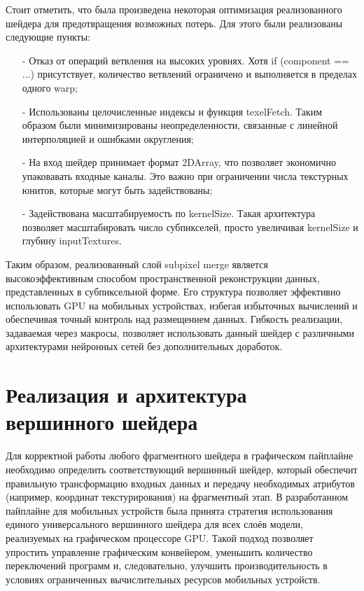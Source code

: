 \documentclass[a4paper,14pt]{extreport}
\begin{document}
            Стоит отметить, что была произведена некоторая оптимизация реализованного шейдера для предотвращения возможных потерь. Для этого были реализованы следующие пункты:
            \begin{itemize}
                \item[-] Отказ от операций ветвления на высоких уровнях. Хотя if (component == ...) присутствует, количество ветвлений ограничено и выполняется в пределах одного warp;
                \item[-] Использованы целочисленные индексы и функция texelFetch. Таким образом были минимизированы неопределенности, связанные с линейной интерполяцией и ошибками округления;
                \item[-] На вход шейдер принимает формат 2DArray, что позволяет экономично упаковавать входные каналы. Это важно при ограничении числа текстурных юнитов, которые могут быть задействованы;
                \item[-] Задействована масштабируемость по kernelSize. Такая архитектура позволяет масштабировать число субпикселей, просто увеличивая kernelSize и глубину inputTextures.
            \end{itemize}
            
            Таким образом, реализованный слой subpixel merge является высокоэффективным способом пространственной реконструкции данных, представленных в субпиксельной форме. Его структура позволяет эффективно использовать GPU на мобильных устройствах, избегая избыточных вычислений и обеспечивая точный контроль над размещением данных. Гибкость реализации, задаваемая через макросы, позволяет использовать данный шейдер с различными архитектурами нейронных сетей без дополнительных доработок.
        
        \section{Реализация и архитектура вершинного шейдера}
            Для корректной работы любого фрагментного шейдера в графическом пайплайне необходимо определить соответствующий вершинный шейдер, который обеспечит правильную трансформацию входных данных и передачу необходимых атрибутов (например, координат текстурирования) на фрагментный этап. В разработанном пайплайне для мобильных устройств была принята стратегия использования единого универсального вершинного шейдера для всех слоёв модели, реализуемых на графическом процессоре GPU. Такой подход позволяет упростить управление графическим конвейером, уменьшить количество переключений программ и, следовательно, улучшить производительность в условиях ограниченных вычислительных ресурсов мобильных устройств.
    
\end{document}
